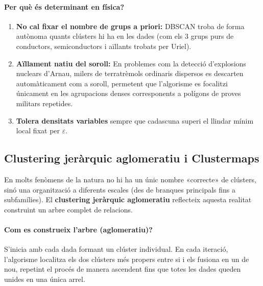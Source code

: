 \documentclass[a4paper,11pt]{article}
\begin{document}
\paragraph{Per què és determinant en física?}
\begin{enumerate}
    \item \textbf{No cal fixar el nombre de grups a priori:} DBSCAN troba de forma autònoma quants clústers hi ha en les dades (com els 3 grups purs de conductors, semiconductors i aïllants trobats per Uriel).
    \item \textbf{Aïllament natiu del soroll:} En problemes com la detecció d'explosions nuclears d'Arnau, milers de terratrèmols ordinaris dispersos es descarten automàticament com a soroll, permetent que l'algorisme es focalitzi únicament en les agrupacions denses corresponents a polígons de proves militars repetides.
    \item \textbf{Tolera densitats variables} sempre que cadascuna superi el llindar mínim local fixat per $\varepsilon$.
\end{enumerate}

\subsection{Clustering jeràrquic aglomeratiu i Clustermaps}

En molts fenòmens de la natura no hi ha un únic nombre «correcte» de clústers, sinó una organització a diferents escales (des de branques principals fins a subfamílies). El \textbf{clustering jeràrquic aglomeratiu} \cite{eisen} reflecteix aquesta realitat construint un arbre complet de relacions.

\paragraph{Com es construeix l'arbre (aglomeratiu)?} S'inicia amb cada dada formant un clúster individual. En cada iteració, l'algorisme localitza els dos clústers més propers entre si i els fusiona en un de nou, repetint el procés de manera ascendent fins que totes les dades queden unides en una única arrel.
\end{document}
